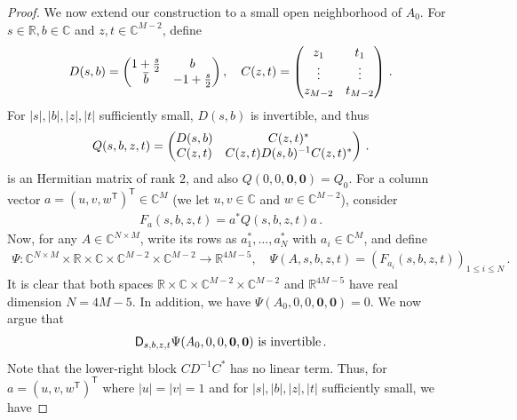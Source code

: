\documentclass[11pt,reqno]{amsart}
\begin{document}
\begin{proof}
We now extend our construction to a small open neighborhood of $A_0$. For $s \in \mathbb R, b \in \mathbb C$ and $z,t \in \mathbb C^{M-2}$, define
\begin{equation}{\label{eq:def-matrix-D-C}}
    D(s,b)=
    \begin{pmatrix}
        1+\frac{s}{2} & b \\
        \overline{b} & -1+\frac{s}{2}
    \end{pmatrix}, \quad
    C(z,t)=
    \begin{pmatrix}
        z_1 & t_1 \\
        \vdots & \vdots \\
        z_{M-2} & t_{M-2} 
    \end{pmatrix} \,.
\end{equation}
For $|s|,|b|,|z|,|t|$ sufficiently small, $D(s,b)$ is invertible, and thus
\begin{equation}{\label{eq:def-Q(s,b,z,t)}}
    Q(s,b,z,t) = 
    \begin{pmatrix}
        D(s,b) & C(z,t)^* \\
        C(z,t) & C(z,t) D(s,b)^{-1} C(z,t)^*
    \end{pmatrix} \,.
\end{equation}
is an Hermitian matrix of rank $2$, and also $Q(0,0,\mathbf 0,\mathbf 0)=Q_0$. For a column vector $a=(u,v,w^{\mathsf T})^{\mathsf T}\in\mathbb C^M$ (we let $u,v \in \mathbb C$ and $w \in \mathbb C^{M-2}$), consider
\begin{align*}
    F_a(s,b,z,t) = a^* Q(s,b,z,t) a \,.
\end{align*}
Now, for any $A \in \mathbb C^{N \times M}$, write its rows as $a_1^*,\ldots,a_N^*$ with $a_i\in\mathbb C^M$, and define
\begin{align*}
    \Psi: \mathbb C^{N\times M} \times \mathbb R \times \mathbb C \times \mathbb C^{M-2} \times \mathbb C^{M-2} \to \mathbb R^{4M-5}, \quad \Psi(A,s,b,z,t)= ( F_{a_i}(s,b,z,t) )_{1 \leq i \leq N} \,.
\end{align*}
It is clear that both spaces $\mathbb R \times \mathbb C \times \mathbb C^{M-2} \times \mathbb C^{M-2}$ and $\mathbb R^{4M-5}$ have real dimension $N=4M-5$. In addition, we have $\Psi(A_0,0,0,\mathbf 0,\mathbf 0)=0$. We now argue that 
\begin{align}{\label{eq:diff-form-invertible}}
    \mathsf{D}_{s,b,z,t}\Psi(A_0,0,0,\mathbf 0,\mathbf 0) \mbox{ is invertible} \,.
\end{align}
Note that the lower-right block $CD^{-1}C^*$ has no linear term. Thus, for $a=(u,v,w^{\mathsf T})^{\mathsf T}$ where $|u|=|v|=1$ and for $|s|,|b|,|z|,|t|$ sufficiently small, we have

\end{proof}
\end{document}
